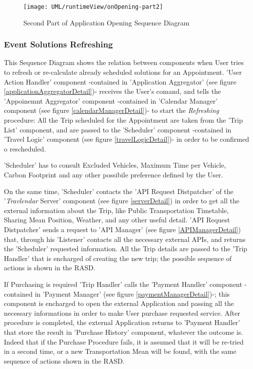 	\vfill
	
	\begin{figure}[ht!]\ContinuedFloat
		\centering
		\texttt{[image: UML/runtimeView/onOpening-part2]}
		\caption{Second Part of Application Opening Sequence Diagram}
		\label{loginRunTimeView}
	\end{figure}
	

\subsubsection{Event Solutions Refreshing}
	
	This Sequence Diagram shows the relation between components when User tries to refresh or re-calculate already scheduled solutions for an Appointment.
	'User Action Handler' component  -contained in 'Application Aggregator' (see figure \ref{applicationAggregatorDetail})- receives the User's comand, and tells the 'Appoinemnt Aggregator' component -contained in 'Calendar Manager' component (see figure \ref{calendarManagerDetail})- to start the \textsl{Refreshing} procedure:
	All the Trip scheduled for the Appointment are taken from the 'Trip List' component, and are passed to the 'Scheduler' component  -contained in 'Travel Logic' component (see figure \ref{travelLogicDetail})-  in order to be confirmed o rescheduled.
	
	'Scheduler' has to consult Excluded Vehicles, Maximum Time per Vehicle, Carbon Footprint and any other possibile preference defined by the User.
	
	On the same time, 'Scheduler' contacts the 'API Request Distpatcher' of the '\textit{Travlendar} Server' component (see figure \ref{serverDetail}) in order to get all the external information about the Trip, like Public Transportation Timetable, Sharing Mean Position, Weather, and any other useful detail.
	'API Request Distpatcher' sends a request to 'API Manager' (see figure \ref{APIManagerDetail}) that, through his 'Listener' contacts all the necessary external APIs, and returns the 'Scheduler' requested information.
	All the Trip details are passed to the 'Trip Handler' that is encharged of creating the new trip; the possible sequence of actions is shown in the RASD.
	
	If Purchasing is required 'Trip Handler' calls the 'Payment Handler' component  -contained in 'Payment Manager' (see figure \ref{paymentManagerDetail})-; this component is encharged to open the external Application and passing all the necessary informations in order to make User purchase requested service.
	After procedure is completed, the external Application returns to 'Payment Handler' that store the result in 'Purchase History' component, whatever the outcome is.
	Indeed that if the Purchase Procedure fails, it is assumed that it will be re-tried in a second time, or a new Transportation Mean will be found, with the same sequence of actions shown in the RASD.
	
